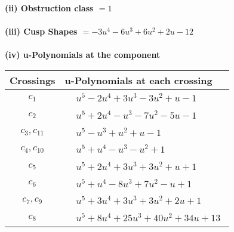 \documentclass[1p]{elsarticle_modified}
\theoremstyle{definition}
\begin{document}
\flushleft \textbf{(ii) Obstruction class $= 1$}\\~\\
\flushleft \textbf{(iii) Cusp Shapes $= -3 u^4-6 u^3+6 u^2+2 u-12$}\\~\\
\newpage\renewcommand{\arraystretch}{1}
\flushleft \textbf{(iv) u-Polynomials at the component}\newline \\
\begin{tabular}{m{50pt}|m{274pt}}
Crossings & \hspace{64pt}u-Polynomials at each crossing \\
\hline $$\begin{aligned}c_{1}\end{aligned}$$&$\begin{aligned}
&u^5-2 u^4+3 u^3-3 u^2+u-1
\end{aligned}$\\
\hline $$\begin{aligned}c_{2}\end{aligned}$$&$\begin{aligned}
&u^5+2 u^4- u^3-7 u^2-5 u-1
\end{aligned}$\\
\hline $$\begin{aligned}c_{3},c_{11}\end{aligned}$$&$\begin{aligned}
&u^5- u^3+u^2+u-1
\end{aligned}$\\
\hline $$\begin{aligned}c_{4},c_{10}\end{aligned}$$&$\begin{aligned}
&u^5+u^4- u^3- u^2+1
\end{aligned}$\\
\hline $$\begin{aligned}c_{5}\end{aligned}$$&$\begin{aligned}
&u^5+2 u^4+3 u^3+3 u^2+u+1
\end{aligned}$\\
\hline $$\begin{aligned}c_{6}\end{aligned}$$&$\begin{aligned}
&u^5+u^4-8 u^3+7 u^2- u+1
\end{aligned}$\\
\hline $$\begin{aligned}c_{7},c_{9}\end{aligned}$$&$\begin{aligned}
&u^5+3 u^4+3 u^3+3 u^2+2 u+1
\end{aligned}$\\
\hline $$\begin{aligned}c_{8}\end{aligned}$$&$\begin{aligned}
&u^5+8 u^4+25 u^3+40 u^2+34 u+13
\end{aligned}$\\
\hline
\end{tabular}\\~\\
\end{document}

